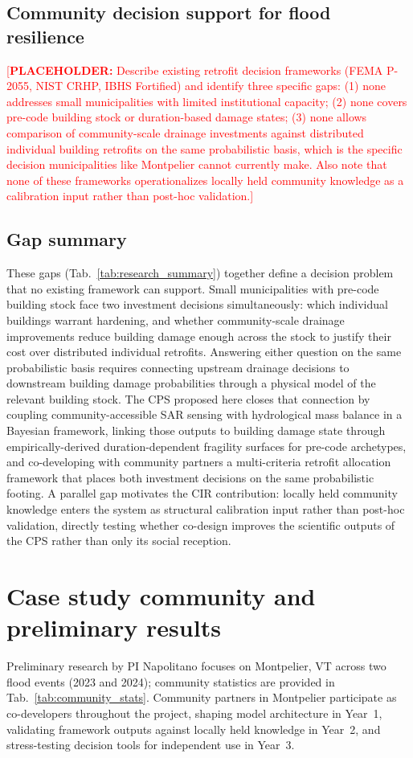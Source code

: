\documentclass[11pt]{article}
\newcommand{\placeholder}[1]{\textcolor{red}{[\textbf{PLACEHOLDER:} #1]}}
\begin{document}
\subsection{Community decision support for flood resilience}
\placeholder{Describe existing retrofit decision frameworks (FEMA P-2055, NIST CRHP, IBHS Fortified) and identify three specific gaps: (1) none addresses small municipalities with limited institutional capacity; (2) none covers pre-code building stock or duration-based damage states; (3) none allows comparison of community-scale drainage investments against distributed individual building retrofits on the same probabilistic basis, which is the specific decision municipalities like Montpelier cannot currently make. Also note that none of these frameworks operationalizes locally held community knowledge as a calibration input rather than post-hoc validation.}

\subsection{Gap summary}
These gaps (Tab.~\ref{tab:research_summary}) together define a decision problem that no existing framework can support. 
Small municipalities with pre-code building stock face two investment decisions simultaneously: which individual buildings warrant hardening, and whether community-scale drainage improvements reduce building damage enough across the stock to justify their cost over distributed individual retrofits. 
Answering either question on the same probabilistic basis requires connecting upstream drainage decisions to downstream building damage probabilities through a physical model of the relevant building stock. 
The CPS proposed here closes that connection by coupling community-accessible SAR sensing with hydrological mass balance in a Bayesian framework, linking those outputs to building damage state through empirically-derived duration-dependent fragility surfaces for pre-code archetypes, and co-developing with community partners a multi-criteria retrofit allocation framework that places both investment decisions on the same probabilistic footing. 
A parallel gap motivates the CIR contribution: locally held community knowledge enters the system as structural calibration input rather than post-hoc validation, directly testing whether co-design improves the scientific outputs of the CPS rather than only its social reception.

\section{Case study community and preliminary results}
Preliminary research by PI Napolitano focuses on Montpelier, VT across two flood events (2023 and 2024); community statistics are provided in Tab.~\ref{tab:community_stats}.
Community partners in Montpelier participate as co-developers throughout the project, shaping model architecture in Year~1, validating framework outputs against locally held knowledge in Year~2, and stress-testing decision tools for independent use in Year~3.
\end{document}
